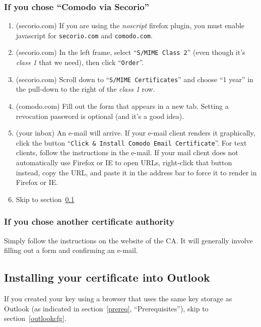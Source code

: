 \documentclass[pdftex,12pt,titlepage=false]{scrartcl}
\begin{document}
\subsubsection{If you chose ``Comodo via Secorio''}
\begin{multicols}{2}
  \begin{enumerate}
  \item (secorio.com) If you are using the \emph{noscript} firefox
    plugin, you must enable javascript for \texttt{secorio.com} and
    \texttt{comodo.com}.
  \item (secorio.com) In the left frame, select ``\texttt{S/MIME Class
      2}'' (even though it's \emph{class 1} that we need), then click
    ``\texttt{Order}''.
  \item (secorio.com) Scroll down to ``\texttt{S/MIME Certificates}''
    and choose ``1 year'' in the pull-down to the right of the
    \emph{class 1} row.
  \item (comodo.com) Fill out the form that appears in a new tab.
    Setting a revocation password is optional (and it's a good
    idea).%
  \item (your inbox) An e-mail will arrive.  If your e-mail client
    renders it graphically, click the button ``\texttt{Click \&
      Install Comodo Email Certificate}''.  For text clients, follow
    the instructions in the e-mail.  If your mail client does not
    automatically use Firefox or IE to open URLs, right-click that
    button instead, copy the URL, and paste it in the address bar to
    force it to render in Firefox or IE.
  \item Skip to section~\ref{cert_install}
  \end{enumerate}
\end{multicols}

\subsubsection{If you chose another certificate authority}
Simply follow the instructions on the website of the CA.  It will
generally involve filling out a form and confirming an e-mail.

\subsection{Installing your certificate into Outlook}\label{cert_install}
If you created your key using a browser that uses the same key storage
as Outlook (as indicated in section~\ref{prereq}, ``Prerequisites''),
skip to section~\ref{outlookcfg}.
\end{document}
